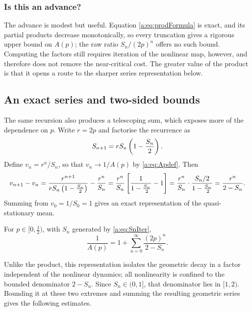 \subsubsection*{Is this an advance?}

The advance is modest but useful.  Equation \cref{a:eq:prodFormula} is exact, and
its partial products decrease monotonically, so every truncation gives a rigorous
upper bound on $A(p)$; the raw ratio $S_n/(2p)^n$ offers no such bound.  Computing
the factors still requires iteration of the nonlinear map, however, and therefore
does not remove the near-critical cost.  The greater value of the product is that
it opens a route to the sharper series representation below.

\subsection{An exact series and two-sided bounds}
\label{a:sec:Abounds}

The same recursion also produces a telescoping sum, which exposes more of the
dependence on $p$.  Write $r=2p$ and factorise the recurrence as
\begin{equation*}
S_{n+1} = rS_n\left(1-\frac{S_n}{2}\right) .
\end{equation*}
Define $v_n = r^n/S_n$, so that $v_n\to1/A(p)$ by \cref{a:eq:Apdef}. Then
\begin{equation*}
v_{n+1}-v_n
= \frac{r^{n+1}}{rS_n\left(1-\frac{S_n}{2}\right)} - \frac{r^n}{S_n}
= \frac{r^n}{S_n}\left[\frac{1}{1-\frac{S_n}{2}}-1\right]
= \frac{r^n}{S_n}\cdot\frac{S_n/2}{1-\frac{S_n}{2}}
= \frac{r^n}{2-S_n} .
\end{equation*}
Summing from $v_0 = 1/S_0 = 1$ gives an exact representation of the
quasi-stationary mean.

\begin{proposition}
\label{a:prop:series}
For $p\in[0,\tfrac12)$, with $S_n$ generated by \cref{a:eq:SnIter},
\begin{equation}
\label{a:eq:Aseries}
\frac{1}{A(p)} = 1 + \sum_{n=0}^{\infty}\frac{(2p)^n}{2-S_n} .
\end{equation}
\end{proposition}

\noindent
Unlike the product, this representation isolates the geometric decay in a factor
independent of the nonlinear dynamics; all nonlinearity is confined to the bounded
denominator $2-S_n$.  Since $S_n\in(0,1]$, that denominator lies in $[1,2)$.
Bounding it at these two extremes and summing the resulting geometric series gives
the following estimates.

